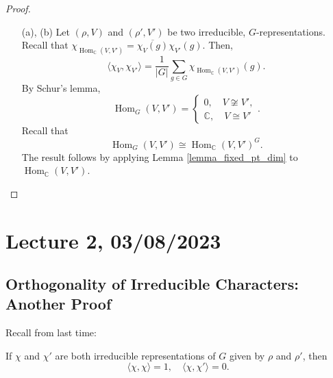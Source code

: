 \documentclass[a4paper]{report}
\theoremstyle{definition}
\theoremstyle{remark}
\theoremstyle{proposition}
\theoremstyle{conjecture}
\theoremstyle{lemma}
\theoremstyle{corollary}
\theoremstyle{exercise}
\theoremstyle{example}
\newcommand{\C}{\mathbb{C}}
\newcommand{\on}{\operatorname}
\begin{document}
\begin{proof}
    \leavevmode
    \begin{itemize}
        \item[(a), (b)] Let $(\rho,V)$ and $(\rho',V')$ be two irreducible,
            $G$-representations. Recall that 
            $\chi_{\on{Hom}_\C(V,V')} = \overline{\chi_V(g)}\chi_{V'}(g)$. 
            Then,
            $$\langle \chi_V,\chi_{V'}\rangle = \frac{1}{\vert G\vert} \sum_{g\in G} \chi_{\on{Hom}_\C(V,V')}(g).$$
            By Schur's lemma, 
            $$\on{Hom}_G(V,V') = \begin{cases}
                0, \quad V\not\cong V',\\
                \C, \quad V \cong V'
            \end{cases}.$$
            Recall that $$\on{Hom}_G(V,V') \cong \on{Hom}_\C(V,V')^G.$$
            The result follows by applying Lemma \ref{lemma_fixed_pt_dim} to
            $\on{Hom}_\C(V,V')$.
    \end{itemize}
\end{proof}

\section{Lecture 2, 03/08/2023}

\subsection{Orthogonality of Irreducible Characters: Another Proof}

Recall from last time:
\begin{theorem}
    If $\chi$ and $\chi'$ are both irreducible representations of $G$
    given by $\rho$ and $\rho'$, then $$\langle\chi,\chi\rangle = 1, \quad 
    \langle \chi,\chi'\rangle = 0.$$
\end{theorem}
\end{document}
